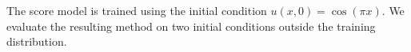 \documentclass[letterpaper]{article} %
\begin{document}
The score model is trained using the initial condition $u(x,0)=\cos(\pi x)$.
We evaluate
the resulting method on two initial conditions outside the training
distribution.


\end{document}

